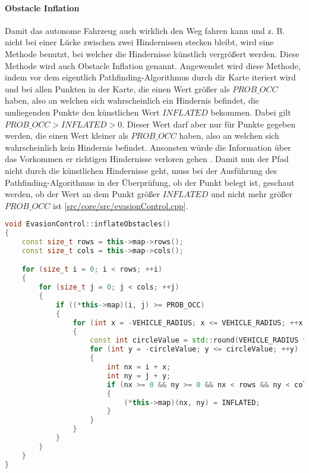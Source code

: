 \paragraph{Obstacle Inflation} \mbox{}

Damit das autonome Fahrzeug auch wirklich den Weg fahren kann und z. B. nicht bei einer Lücke zwischen zwei Hindernissen stecken bleibt, wird eine Methode benutzt, bei welcher die Hindernisse künstlich vergrößert werden. Diese Methode wird auch Obstacle Inflation genannt. Angewendet wird diese Methode, indem vor dem eigentlich Pathfinding-Algorithmus durch dir Karte iteriert wird und bei allen Punkten in der Karte, die einen Wert größer als \(PROB\_OCC\) haben, also an welchen sich wahrscheinlich ein Hindernis befindet, die umliegenden Punkte den künstlichen Wert \(INFLATED\) bekommen. Dabei gilt \(PROB\_OCC > INFLATED > 0\). Dieser Wert darf aber nur für Punkte gegeben werden, die einen Wert kleiner als \(PROB\_OCC\) haben, also an welchen sich wahrscheinlich kein Hindernis befindet. Ansonsten würde die Information über das Vorkommen er richtigen Hindernisse verloren gehen \cite{fernandesOrientationEnhancedAstar2015}. Damit nun der Pfad nicht durch die künstlichen Hindernisse geht, muss bei der Ausführung des Pathfinding-Algorithmus in der Überprüfung, ob der Punkt belegt ist, geschaut werden, ob der Wert an dem Punkt größer \(INFLATED\) und nicht mehr größer \(PROB\_OCC\) ist [\href{https://github.com/Jundy0/Studienarbeit/blob/main/src/core/src/evasionControl.cpp}{src/core/src/evasionControl.cpp}]. 

\begin{lstlisting}[caption={Obstacles Inflation},label={lst:inflateObstacles},language={C++}]
void EvasionControl::inflateObstacles()
{
    const size_t rows = this->map->rows();
    const size_t cols = this->map->cols();

    for (size_t i = 0; i < rows; ++i)
    {
        for (size_t j = 0; j < cols; ++j)
        {
            if ((*this->map)(i, j) >= PROB_OCC)
            {
                for (int x = -VEHICLE_RADIUS; x <= VEHICLE_RADIUS; ++x)
                {
                    const int circleValue = std::round(VEHICLE_RADIUS * std::cos(std::abs(x) * M_PI / (2 * VEHICLE_RADIUS)));
                    for (int y = -circleValue; y <= circleValue; ++y)
                    {
                        int nx = i + x;
                        int ny = j + y;
                        if (nx >= 0 && ny >= 0 && nx < rows && ny < cols && (*this->map)(nx, ny) < PROB_OCC)
                        {
                            (*this->map)(nx, ny) = INFLATED;
                        }
                    }
                }
            }
        }
    }
}
\end{lstlisting}

